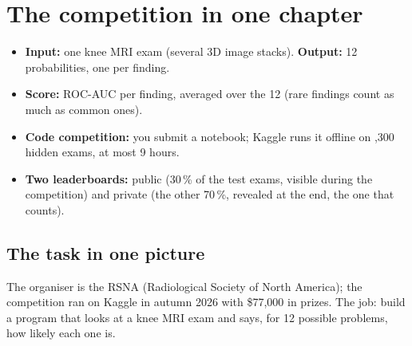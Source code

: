 \chapter{The competition in one chapter}
\label{ch:competition}

\begin{tldr}
\begin{itemize}
\item \textbf{Input:} one knee MRI exam (several 3D image stacks). \textbf{Output:} 12 probabilities, one per finding.
\item \textbf{Score:} ROC-AUC per finding, averaged over the 12 (rare findings count as much as common ones).
\item \textbf{Code competition:} you submit a notebook; Kaggle runs it offline on ,300 hidden exams, at most 9 hours.
\item \textbf{Two leaderboards:} public (30\,\% of the test exams, visible during the competition) and private
      (the other 70\,\%, revealed at the end, the one that counts).
\end{itemize}
\end{tldr}

\section{The task in one picture}

The organiser is the RSNA (Radiological Society of North America); the competition ran on Kaggle in
autumn 2026 with \$77{,}000 in prizes. The job: build a program that looks at a knee MRI exam and says, for
12 possible problems, how likely each one is.

